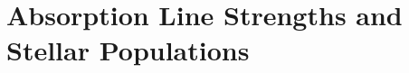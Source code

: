 \documentclass[fleqn,usenatbib,useAMS]{mnras}
\begin{document}



\section{Absorption Line Strengths and Stellar Populations}
	\label{sec:stellarPop}


\end{document}
